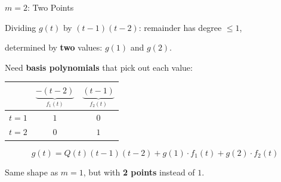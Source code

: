 \documentclass[10pt]{beamer}
\theoremstyle{definition}
\newcommand{\x}[1]{\alert{\textbf{#1}}}
\begin{document}
%
\begin{frame}{$m = 2$: Two Points}

Dividing $g(t)$ by $(t - 1)(t - 2)$: remainder has degree $\leq 1$,

determined by \x{two} values: $g(1)$ and $g(2)$.

\vfill

Need \x{basis polynomials} that pick out each value:

\begin{center}
\renewcommand{\arraystretch}{1.3}
\begin{tabular}{c|cc}
 & $\underbrace{-(t-2)}_{f_1(t)}$ & $\underbrace{(t-1)}_{f_2(t)}$ \\[4pt]
\hline
$t = 1$ & $1$ & $0$ \\
$t = 2$ & $0$ & $1$
\end{tabular}
\end{center}

\vfill

$$g(t) = Q(t)(t-1)(t-2) + g(1)\cdot f_1(t) + g(2) \cdot f_2(t)$$

\vfill

Same shape as $m = 1$, but with \x{2 points} instead of $1$.

\end{frame}
\end{document}

